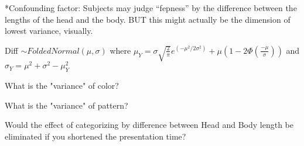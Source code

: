 \documentclass[12pt]{article}
\begin{document}
\vspace{0.2in}

\noindent **Confounding factor: Subjects may judge ``fepness'' by the difference between the lengths of the head and the body. BUT this might actually be the dimension of lowest variance, visually.

\vspace{0.2in}

\noindent Diff $\sim FoldedNormal(\mu,\sigma)$ where $\mu_Y = \sigma \sqrt{\frac{2}{\pi}}e^{(-\mu^2/2\sigma^2)} + \mu (1-2\Phi(\frac{-\mu}{\sigma}))$ and $\sigma_Y = \mu^2 + \sigma^2 - \mu_Y ^2$

\noindent What is the "variance" of color?

\noindent What is the "variance" of pattern?

\noindent Would the effect of categorizing by difference between Head and Body length be eliminated if you shortened the presentation time?
\end{document}
